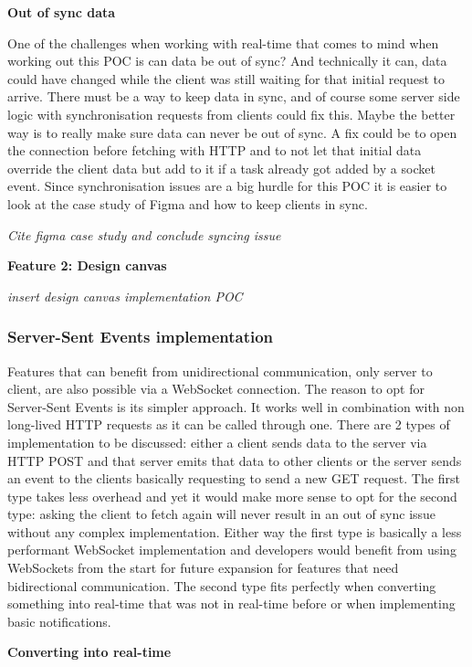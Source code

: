 \textbf{Out of sync data}

One of the challenges when working with real-time that comes to mind when working out this POC is can data be out of sync? And technically it can, data could have changed while the client was still waiting for that initial request to arrive. There must be a way to keep data in sync, and of course some server side logic with synchronisation requests from clients could fix this. Maybe the better way is to really make sure data can never be out of sync. A fix could be to open the connection before fetching with HTTP and to not let that initial data override the client data but add to it if a task already got added by a socket event. Since synchronisation issues are a big hurdle for this POC it is easier to look at the case study of Figma and how to keep clients in sync.

\textit{Cite figma case study and conclude syncing issue}

\textbf{Feature 2: Design canvas}

\textit{insert design canvas implementation POC}

\subsubsection{Server-Sent Events implementation}

Features that can benefit from unidirectional communication, only server to client, are also possible via a WebSocket connection. The reason to opt for Server-Sent Events is its simpler approach. It works well in combination with non long-lived HTTP requests as it can be called through one. There are 2 types of implementation to be discussed: either a client sends data to the server via HTTP POST and that server emits that data to other clients or the server sends an event to the clients basically requesting to send a new GET request. The first type takes less overhead and yet it would make more sense to opt for the second type: asking the client to fetch again will never result in an out of sync issue without any complex implementation. Either way the first type is basically a less performant WebSocket implementation and developers would benefit from using WebSockets from the start for future expansion for features that need bidirectional communication. The second type fits perfectly when converting something into real-time that was not in real-time before or when implementing basic notifications.

\textbf{Converting into real-time}

